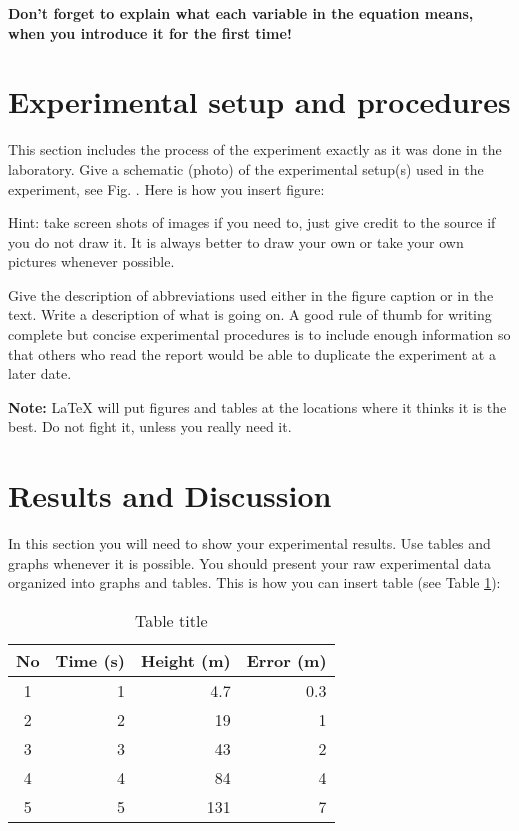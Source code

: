 \documentclass[twocolumn,secnumarabic,amssymb, nobibnotes, aps, pra]{revtex4}
\begin{document}
{\bf Don't forget to explain what each variable in the equation means, when you introduce it for the first time!}  %

\section{Experimental setup and procedures}

This section includes the process of the experiment exactly as it was done in the laboratory. Give a schematic (photo) of the experimental setup(s) used in the experiment, see Fig. . Here is how you insert figure:

Hint: take screen shots of images if you need to, just give credit to the source if you do not draw it.  It is always better to draw your own or take your own pictures whenever possible.

Give the description of abbreviations used either in the figure caption or in the text. Write a description of what is going on. A good rule of thumb for writing complete but concise experimental procedures is to include enough information so that others who read the report would be able to duplicate the experiment at a later date. 

{\bf Note:} LaTeX will put figures and tables at the locations where it thinks it is the best. Do not fight it, unless you really need it.


\section{Results and Discussion}

In this section you will need to show your experimental results. Use tables and graphs whenever it is possible. You should present your raw experimental data organized into graphs and tables. This is how you can insert table (see Table \ref{tab:sampletable}):
\begin{table} [htb]  %
\caption{Table title}      %
\centering              %
\begin{tabular}{crrr} %
\hline\hline %
  No & Time (s)  & Height (m) & Error (m)   \\
\hline %
1 & 1 & 4.7 & 0.3  \\
2 & 2 & 19 & 1\\ %
3 & 3 & 43 & 2\\
4 & 4 & 84 & 4\\
5 & 5 & 131 & 7\\
\hline %
\end{tabular}
\label{tab:sampletable}
\end{table}
\end{document}

